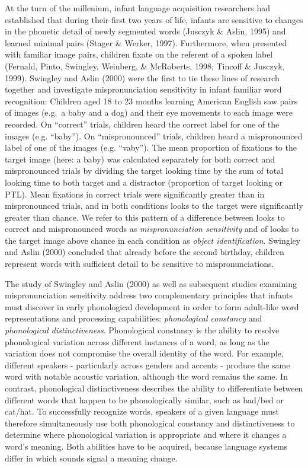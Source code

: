 \documentclass[man]{apa6}
\theoremstyle{definition}
\theoremstyle{definition}
\theoremstyle{definition}
\theoremstyle{remark}
\begin{document}
At the turn of the millenium, infant language acquisition researchers
had established that during their first two years of life, infants are
sensitive to changes in the phonetic detail of newly segmented words
(Jusczyk \& Aslin, 1995) and learned minimal pairs (Stager \& Werker,
1997). Furthermore, when presented with familiar image pairs, children
fixate on the referent of a spoken label (Fernald, Pinto, Swingley,
Weinberg, \& McRoberts, 1998; Tincoff \& Jusczyk, 1999). Swingley and
Aslin (2000) were the first to tie these lines of research together and
investigate mispronunciation sensitivity in infant familiar word
recognition: Children aged 18 to 23 months learning American English saw
pairs of images (e.g.~a baby and a dog) and their eye movements to each
image were recorded. On \enquote{correct} trials, children heard the
correct label for one of the images (e.g. \enquote{baby}). On
\enquote{mispronounced} trials, children heard a mispronounced label of
one of the images (e.g. \enquote{vaby}). The mean proportion of
fixations to the target image (here: a baby) was calculated separately
for both correct and mispronounced trials by dividing the target looking
time by the sum of total looking time to both target and a distractor
(proportion of target looking or PTL). Mean fixations in correct trials
were significantly greater than in mispronounced trials, and in both
conditions looks to the target were significantly greater than chance.
We refer to this pattern of a difference between looks to correct and
mispronounced words as \emph{mispronunciation sensitivity} and of looks
to the target image above chance in each condition as \emph{object
identification}. Swingley and Aslin (2000) concluded that already before
the second birthday, children represent words with sufficient detail to
be sensitive to mispronunciations.

The study of Swingley and Aslin (2000) as well as subsequent studies
examining mispronunciation sensitivity address two complementary
principles that infants must discover in early phonological development
in order to form adult-like word representations and processing
capabilities: \emph{phonological constancy} and \emph{phonological
distinctiveness}. Phonological constancy is the ability to resolve
phonological variation across different instances of a word, as long as
the variation does not compromise the overall identity of the word. For
example, different speakers - particularly across genders and accents -
produce the same word with notable acoustic variation, although the word
remains the same. In contrast, phonological distinctiveness describes
the ability to differentiate between different words that happen to be
phonologically similar, such as bad/bed or cat/hat. To successfully
recognize words, speakers of a given language must therefore
simultaneously use both phonological constancy and distinctiveness to
determine where phonological variation is appropriate and where it
changes a word's meaning. Both abilities have to be acquired, because
language systems differ in which sounds signal a meaning change.
\end{document}
